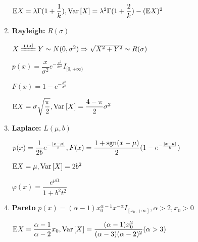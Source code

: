 \begin{enumerate}
 $ \text{E}X = \lambda \Gamma(1+\dfrac{1}{k}), \text{Var}\left[X\right] =
 \lambda^2\Gamma(1+\dfrac{2}{k})-(\text{E}X)^2$

\item \textbf{Rayleigh:} $ R(\sigma)$

  $ X\xlongequal{\text{i.i.d}}Y\sim N(0, \sigma^2)\Rightarrow \sqrt{X^2+Y^2} \sim R(\sigma)$

$ p(x) = \dfrac{x}{\sigma^2}e^{-\frac{x^2}{2\sigma^2}}I_{[0,+\infty)}$

$ F(x) = 1-e^{-\frac{x^2}{\sigma^2}}$

$ \text{E}X = \sigma\sqrt{\dfrac{\pi}{2}}, \text{Var}\left[X\right] = \dfrac{4-\pi}{2}\sigma^2$

\item \textbf{Laplace:} $ L(\mu,b)$

  $ p(x)=\dfrac{1}{2b}e^{-\frac{|x-\mu|}{b}}, F(x)=\dfrac{1+\operatorname{sgn}(x-\mu)}{2}(1-e^{-\frac{|x-\mu|}{b}})$

  $ \text{E}X = \mu, \text{Var}\left[X\right] = 2b^2$

  $ \varphi(x) = \dfrac{e^{\mu it}}{1+b^2t^2}$


\item \textbf{Pareto}
  $ p(x) = (\alpha-1)x_0^{\alpha-1}x^{-\alpha}I_{[x_0,+\infty]}, \alpha>2, x_0>0$

  $ \text{E}X = \dfrac{\alpha-1}{\alpha-2}x_0, \text{Var}\left[X\right] = \dfrac{(\alpha-1)x_0^2}{(\alpha-3)(\alpha-2)^2}(\alpha>3)$

  \end{enumerate}

